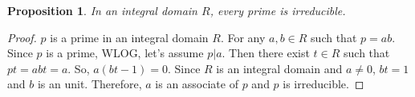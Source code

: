 \documentclass{article}
\newtheorem{pos}{Proposition}
\theoremstyle{definition}\newtheorem{definition}{Definition}
\begin{document}
	\begin{pos}
		In an integral domain $R$, every prime is irreducible.
	\end{pos}
	\begin{proof}
		$p$ is a prime in an integral domain $R$. For any $a,b \in R$ such that $p=ab$. Since $p$ is a prime, WLOG, let's assume $p|a$. Then there exist $t \in R$ such that $pt=abt=a$. So, $a(bt-1)=0$. Since $R$ is an integral domain and $a\neq 0$, $bt=1$ and $b$ is an unit. Therefore, $a$ is an associate of $p$ and $p$ is irreducible.
	\end{proof}
\end{document}
